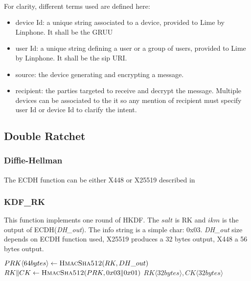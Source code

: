 \documentclass[a4paper,11pt]{article}
\begin{document}
    \paragraph{}For clarity, different terms used are defined here:
    \begin{itemize}
      \item device Id: a unique string associated to a device, provided to Lime by Linphone. It shall be the GRUU\cite{rfc5627}
      \item user Id: a unique string defining a user or a group of users, provided to Lime by Linphone. It shall be the sip URI.
      \item source: the device generating and encrypting a message.
      \item recipient: the parties targeted to receive and decrypt the message. Multiple devices can be associated to the it so any mention of recipient must specify user Id or device Id to clarify the intent.
    \end{itemize}

  \subsection{Double Ratchet}
    \subsubsection{Diffie-Hellman}
      \paragraph{}The ECDH function can be either X448 or X25519 described in \cite{rfc7748}
    \subsubsection{KDF\_RK}
      This function implements one round of HKDF\cite{rfc5869}. The $salt$ is RK and $ikm$ is the output of ECDH(\textit{DH\_out}). The info string is a simple char: 0x03. \textit{DH\_out} size depends on ECDH function used, X25519 produces a 32 bytes output, X448 a 56 bytes output. 

      \begin{algorithmic}
          \State $PRK\langle 64bytes\rangle  \gets \Call{HmacSha512}{RK, DH\_out}$
          \State $RK\Arrowvert CK \gets \Call{HmacSha512}{PRK, 0x03\Arrowvert 0x01}$
          \State \Return $RK\langle 32bytes\rangle , CK\langle 32bytes\rangle$
        \EndFunction
      \end{algorithmic}
\end{document}
